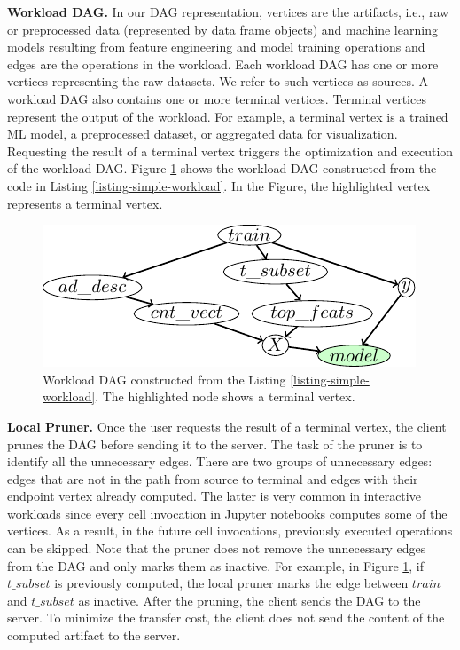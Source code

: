 \textbf{Workload DAG.}
In our DAG representation, vertices are the artifacts, i.e., raw or preprocessed data (represented by data frame objects) and machine learning models resulting from feature engineering and model training operations and edges are the operations in the workload.
Each workload DAG has one or more vertices representing the raw datasets.
We refer to such vertices as sources.
A workload DAG also contains one or more terminal vertices.
Terminal vertices represent the output of the workload.
For example, a terminal vertex is a trained ML model, a preprocessed dataset, or aggregated data for visualization.
Requesting the result of a terminal vertex triggers the optimization and execution of the workload DAG.
Figure \ref{fig-workload-dag} shows the workload DAG constructed from the code in Listing \ref{listing-simple-workload}.
In the Figure, the highlighted vertex represents a terminal vertex.
\begin{figure}
\centering
\includegraphics[width=\linewidth]{../images/tikz-standalone/example-graph}
\caption{Workload DAG constructed from the Listing \ref{listing-simple-workload}. The highlighted node shows a terminal vertex.}
\label{fig-workload-dag}
\end{figure}

\textbf{Local Pruner.}
Once the user requests the result of a terminal vertex, the client prunes the DAG before sending it to the server.
The task of the pruner is to identify all the unnecessary edges.
There are two groups of unnecessary edges: edges that are not in the path from source to terminal and edges with their endpoint vertex already computed.
The latter is very common in interactive workloads since every cell invocation in Jupyter notebooks computes some of the vertices.
As a result, in the future cell invocations, previously executed operations can be skipped.
Note that the pruner does not remove the unnecessary edges from the DAG and only marks them as inactive.
For example, in Figure \ref{fig-workload-dag}, if $t\_subset$ is previously computed, the local pruner marks the edge between $train$ and $t\_subset$ as inactive.
After the pruning, the client sends the DAG to the server.
To minimize the transfer cost, the client does not send the content of the computed artifact to the server.


